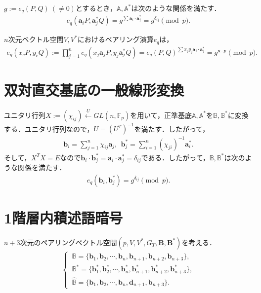 \documentclass[a4paper]{jsarticle}
\begin{document}
$g:=e_q(P,Q)\ (\ne 0)$とするとき，$\mathbb{A}, \mathbb{A}^*$は次のような関係を満たす．
\begin{align}
e_q(\bm{a}_iP, \bm{a}^*_jQ) = g^{\sum\bm{a}_i\cdot\bm{a}^*_j} = g^{\delta_{ij}}\pmod{p}.
\end{align}


$n$次元ベクトル空間$V,V^*$におけるペアリング演算$e_q$は，
\begin{align}
e_q(x_cP, y_cQ) := \prod_{j=1}^n e_q(x_j\bm{a}_jP, y_j\bm{a}^*_jQ) = e_q(P, Q)^{\sum x_jy_j\bm{a}_j\cdot\bm{a}^*_j}=g^{\bm{x}\cdot\bm{y}}\pmod{p}.
\end{align}

\section{双対直交基底の一般線形変換}
ユニタリ行列$X:=(\chi_{ij})\overset{U}{\leftarrow} GL(n, \mathbb{F}_p)$を用いて，正準基底$\mathbb{A},\mathbb{A}^*$を$\mathbb{B},\mathbb{B}^*$に変換する．ユニタリ行列なので，$U=(U^T)^{-1}$を満たす．したがって，
\begin{align}
\bm{b}_i = \sum_{j=1}^n \chi_{ij}\bm{a}_j,\ \ \bm{b}_j^* = \sum_{i=1}^n (\chi_{ji})^{-1}\bm{a}_i^*.
\end{align}
そして，$X^TX=E$なので$\bm{b}_i\cdot\bm{b}^*_j = \bm{a}_i\cdot\bm{a}_j^*=\delta_{ij}$である．したがって，$\mathbb{B},\mathbb{B}^*$は次のような関係を満たす．
\begin{align}
e_q(\bm{b}_i, \bm{b}^*_j) = g^{\delta_{ij}}\pmod{p}.
\end{align}



\section{1階層内積述語暗号}
$n+3$次元のペアリングベクトル空間$(p,V,V^*, G_T, \bm{B},\bm{B}^*)$を考える．
\begin{align}
\begin{cases}
\ \mathbb{B} = \{ \bm{b}_1, \bm{b}_2, \cdots, \bm{b}_n, \bm{b}_{n+1},\bm{b}_{n+2},\bm{b}_{n+3}\},\\
\ \mathbb{B}^* = \{ \bm{b}^*_1, \bm{b}^*_2, \cdots, \bm{b}^*_n, \bm{b}^*_{n+1},\bm{b}^*_{n+2},\bm{b}^*_{n+3} \},\\
\ \hat{\mathbb{B}} = \{ \bm{b}_1, \bm{b}_2, \cdots, \bm{b}_n, \bm{d}_{n+1},\bm{b}_{n+3} \}.
\end{cases}
\end{align}
\end{document}
